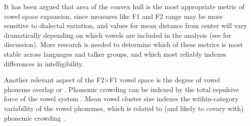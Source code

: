 It has been argued that area of the convex hull is the most appropriate metric of vowel space expansion, since measures like F1 and F2 range may be more sensitive to dialectal variation, and values for mean distance from center will vary dramatically depending on which vowels are included in the analysis (see \citealt{McCloyEtAl2013} for discussion).  More research is needed to determine which of these metrics is most stable across languages and talker groups, and which most reliably indexes differences in intelligibility.

Another relevant aspect of the F2×F1 vowel space is the degree of vowel phoneme overlap or .  Phonemic crowding can be indexed by the total repulsive force of the vowel system \citep[see][]{McCloyEtAl2013}.  Mean vowel cluster size indexes the within-category variability of the vowel phonemes, which is related to (and likely to covary with) phonemic crowding \citep{McCloyEtAl2013}.  



